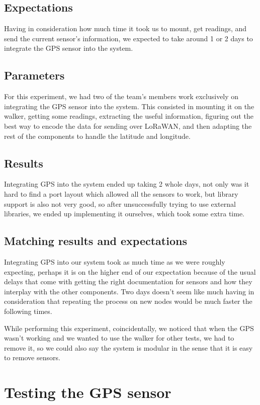 	\subsection*{Expectations}
	Having in consideration how much time it took us to mount, get readings, and send the current sensor's information, we expected to take around 1 or 2 days to integrate the GPS sensor into the system. 

	\subsection*{Parameters}
	For this experiment, we had two of the team's members work exclusively on integrating the GPS sensor into the system. This consisted in mounting it on the walker, getting some readings, extracting the useful information, figuring out the best way to encode the data for sending over LoRaWAN, and then adapting the rest of the components to handle the latitude and longitude.

	\subsection*{Results}
	Integrating GPS into the system ended up taking 2 whole days, not only was it hard to find a port layout which allowed all the sensors to work, but library support is also not very good, so after unsuccessfully trying to use external libraries, we ended up implementing it ourselves, which took some extra time.

	\subsection*{Matching results and expectations}
	Integrating GPS into our system took as much time as we were roughly expecting, perhaps it is on the higher end of our expectation because of the usual delays that come with getting the right documentation for sensors and how they interplay with the other components. Two days doesn't seem like much having in consideration that repeating the process on new nodes would be much faster the following times.

	While performing this experiment, coincidentally, we noticed that when the GPS wasn't working and we wanted to use the walker for other tests, we had to remove it, so we could also say the system is modular in the sense that it is easy to remove sensors.

\section{Testing the GPS sensor}

